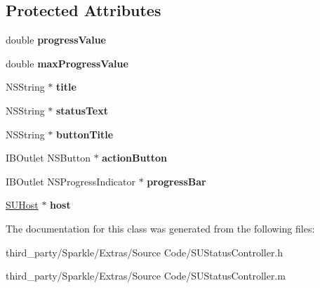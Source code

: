 \subsection*{Protected Attributes}
\begin{DoxyCompactItemize}
\item 
\mbox{\label{interface_s_u_status_controller_ac22fb6574bd262054e967e5f0e650096}} 
double {\bfseries progress\+Value}
\item 
\mbox{\label{interface_s_u_status_controller_ad475ff25a13ca8d7ace0fe53c324e137}} 
double {\bfseries max\+Progress\+Value}
\item 
\mbox{\label{interface_s_u_status_controller_a628f8e093b9b50b1ed62ca467ab3dc30}} 
N\+S\+String $\ast$ {\bfseries title}
\item 
\mbox{\label{interface_s_u_status_controller_a92b41084f05526a1f8bbea38f5facfab}} 
N\+S\+String $\ast$ {\bfseries status\+Text}
\item 
\mbox{\label{interface_s_u_status_controller_aca9c0917a6ed0ec68b42d5dab3e105ac}} 
N\+S\+String $\ast$ {\bfseries button\+Title}
\item 
\mbox{\label{interface_s_u_status_controller_ab4ea8088566d1bbfdeb7a90d8a7c3ae9}} 
I\+B\+Outlet N\+S\+Button $\ast$ {\bfseries action\+Button}
\item 
\mbox{\label{interface_s_u_status_controller_a4e94321f61deaa72dec9fdb4c1bddf58}} 
I\+B\+Outlet N\+S\+Progress\+Indicator $\ast$ {\bfseries progress\+Bar}
\item 
\mbox{\label{interface_s_u_status_controller_af8771553cbc3bb94371f22200d804f21}} 
\mbox{\hyperlink{interface_s_u_host}{S\+U\+Host}} $\ast$ {\bfseries host}
\end{DoxyCompactItemize}


The documentation for this class was generated from the following files\+:\begin{DoxyCompactItemize}
\item 
third\+\_\+party/\+Sparkle/\+Extras/\+Source Code/S\+U\+Status\+Controller.\+h\item 
third\+\_\+party/\+Sparkle/\+Extras/\+Source Code/S\+U\+Status\+Controller.\+m\end{DoxyCompactItemize}
